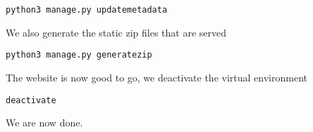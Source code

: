 \documentclass{report}
\begin{document}
	\begin{center}
		\texttt{python3 manage.py updatemetadata}
	\end{center}

	We also generate the static zip files that are served
	
	\begin{center}
		\texttt{python3 manage.py generatezip}
	\end{center}

	The website is now good to go, we deactivate the virtual environment
	
	\begin{center}
		\texttt{deactivate}
	\end{center}

	We are now done.
	
\end{document}

